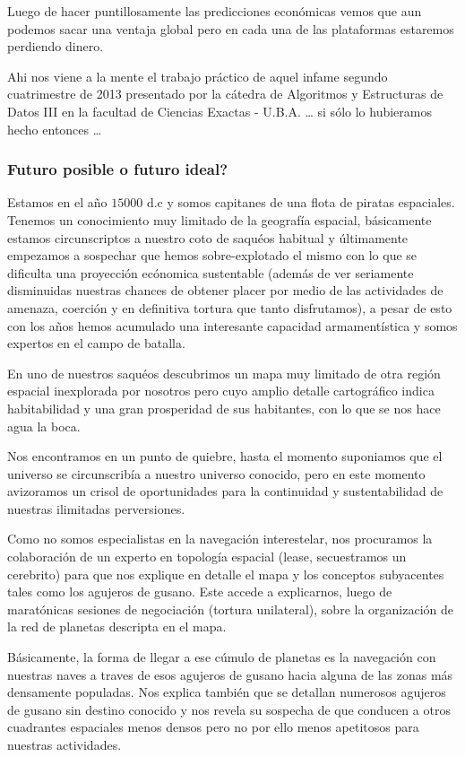 Luego de hacer puntillosamente las predicciones econ\'omicas
vemos que aun podemos sacar una ventaja global pero en cada
una de las plataformas estaremos perdiendo dinero.

Ahi nos viene a la mente el trabajo pr\'actico de 
aquel infame segundo cuatrimestre de 2013 presentado por 
la c\'atedra de Algoritmos y Estructuras de Datos III 
en la facultad de Ciencias Exactas - U.B.A. \ldots
si s\'olo lo hubieramos hecho entonces \ldots


\subsubsection{Futuro posible o futuro ideal?}
Estamos en el a\~no $15000$ d.c y somos capitanes de una flota
de piratas espaciales. Tenemos un conocimiento muy limitado
de la geograf\'ia espacial, b\'asicamente estamos circunscriptos
a nuestro coto de saqu\'eos habitual y \'ultimamente
empezamos a sospechar que hemos sobre-explotado el mismo con
lo que se dificulta una proyecci\'on ec\'onomica sustentable
(adem\'as de ver seriamente disminuidas nuestras chances de
obtener placer por medio de las actividades de amenaza, coerci\'on
y en definitiva tortura que tanto disfrutamos), a pesar de esto
con los a\~nos hemos acumulado una interesante capacidad 
armament\'istica y somos expertos en el campo de batalla.

En uno de nuestros saqu\'eos descubrimos un mapa muy limitado
de otra regi\'on espacial inexplorada por nosotros pero cuyo 
amplio detalle cartogr\'afico indica habitabilidad y una
gran prosperidad de sus habitantes, con lo que se nos hace 
agua la boca.

Nos encontramos en un punto de quiebre, hasta el momento
suponiamos que el universo se circunscrib\'ia a nuestro 
universo conocido, pero en este momento avizoramos un 
crisol de oportunidades para la continuidad y sustentabilidad
de nuestras ilimitadas perversiones.

Como no somos especialistas en la navegaci\'on interestelar, nos
procuramos la colaboraci\'on de un experto en topolog\'ia espacial
(lease, secuestramos un cerebrito) para que nos explique en 
detalle el mapa y los conceptos subyacentes tales como los 
agujeros de gusano. Este accede a explicarnos, luego de marat\'onicas
sesiones de negociaci\'on (tortura unilateral), sobre la organizaci\'on
de la red de planetas descripta en el mapa.

B\'asicamente, la forma de llegar a ese c\'umulo de planetas es
la navegaci\'on con nuestras naves a traves de esos agujeros de
gusano hacia alguna de las zonas m\'as densamente populadas. Nos
explica tambi\'en que se detallan numerosos agujeros de gusano
sin destino conocido y nos revela su sospecha de que conducen 
a otros cuadrantes espaciales menos densos pero no por ello
menos apetitosos para nuestras actividades. 

